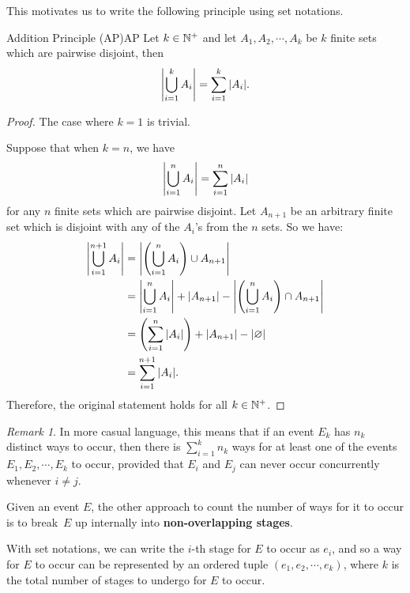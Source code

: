 \documentclass[math]{amznotes}
\theoremstyle{remark}
\newtheorem*{remark}{Remark}
\begin{document}
This motivates us to write the following principle using set notations.
\begin{thmbox}{Addition Principle (AP)}{AP}
    Let $k \in \mathbb{N}^+$ and let $A_1, A_2, \cdots, A_k$ be $k$ finite sets which are pairwise disjoint, then
   \begin{equation*}
        {\left\lvert {\bigcup_{i = 1}^k A_i} \right\rvert} = \sum_{i = 1}^{k}{\left\lvert {A_i} \right\rvert}.
   \end{equation*} 
   \tcblower
   \begin{proof}
        The case where $k = 1$ is trivial.

        Suppose that when $k = n$, we have
        \begin{equation*}
            {\left\lvert {\bigcup_{i = 1}^n A_i} \right\rvert} = \sum_{i = 1}^{n}{\left\lvert {A_i} \right\rvert}
        \end{equation*} 
        for any $n$ finite sets which are pairwise disjoint. Let $A_{n + 1}$ be an arbitrary finite set which is disjoint with any of the $A_i$'s from the $n$ sets. So we have:
        \begin{align*}
            {\left\lvert {\bigcup_{i = 1}^{n + 1} A_i} \right\rvert} & = {\left\lvert {\left(\bigcup_{i = 1}^n A_i\right) \cup A_{n + 1}} \right\rvert} \\
            & = {\left\lvert {\bigcup_{i = 1}^n A_i} \right\rvert} + {\left\lvert {A_{n + 1}} \right\rvert} - {\left\lvert {\left(\bigcup_{i = 1}^n A_i\right) \cap A_{n + 1}} \right\rvert} \\
            & = \left(\sum_{i = 1}^{n}{\left\lvert {A_i} \right\rvert}\right) + {\left\lvert {A_{n + 1}} \right\rvert} - {\left\lvert {\varnothing} \right\rvert} \\
            & = \sum_{i = 1}^{n + 1}{\left\lvert {A_i} \right\rvert}.
        \end{align*}
        Therefore, the original statement holds for all $k \in \mathbb{N}^+$.
   \end{proof}
\end{thmbox}
\begin{notebox}
    \begin{remark}
        In more casual language, this means that if an event $E_k$ has $n_k$ distinct ways to occur, then there is $\sum_{i = 1}^{k}n_k$ ways for at least one of the events $E_1, E_2, \cdots, E_k$ to occur, provided that $E_i$ and $E_j$ can never occur concurrently whenever $i \neq j$.
    \end{remark}
\end{notebox}
Given an event $E$, the other approach to count the number of ways for it to occur is to break~$E$ up internally into \textbf{non-overlapping stages}.

With set notations, we can write the $i$-th stage for $E$ to occur as $e_i$, and so a way for $E$ to occur can be represented by an ordered tuple $(e_1, e_2, \cdots, e_k)$, where $k$ is the total number of stages to undergo for $E$ to occur.
\end{document}
